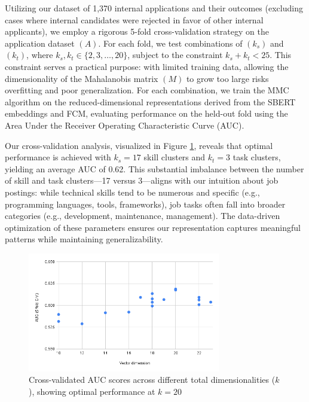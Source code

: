 Utilizing our dataset of 1,370 internal applications and their outcomes (excluding cases where internal
candidates were rejected in favor of other internal applicants), we employ a rigorous 5-fold cross-validation
strategy on the application dataset $(A)$. For each fold, we test combinations of $(k_s)$ and $(k_t)$, where
$k_s, k_t \in \{2, 3, \ldots, 20\}$, subject to the constraint $k_s + k_t < 25$. This constraint serves a
practical purpose: with limited training data, allowing the dimensionality of the Mahalanobis matrix $(M)$
to grow too large risks overfitting and poor generalization. For each combination, we train the MMC algorithm
on the reduced-dimensional representations derived from the SBERT embeddings and FCM, evaluating performance
on the held-out fold using the Area Under the Receiver Operating Characteristic Curve (AUC).

Our cross-validation analysis, visualized in Figure \ref{fig:AUC}, reveals that optimal performance
is achieved with $k_s = 17$ skill clusters and $k_t = 3$ task clusters, yielding an average AUC of 0.62.
This substantial imbalance between the number of skill and task clusters---17 versus 3---aligns with our intuition
about job postings: while technical skills tend to be numerous and specific (e.g., programming languages,
tools, frameworks), job tasks often fall into broader categories (e.g., development, maintenance, management).
The data-driven optimization of these parameters ensures our representation captures meaningful patterns while
maintaining generalizability.

\begin{figure}[htb]
\centering
\includegraphics[width=0.75\textwidth]{new_img/chart.png}
\caption{Cross-validated AUC scores across different total dimensionalities ($k$), showing optimal performance at $k = 20$}
\label{fig:AUC}
\end{figure}



